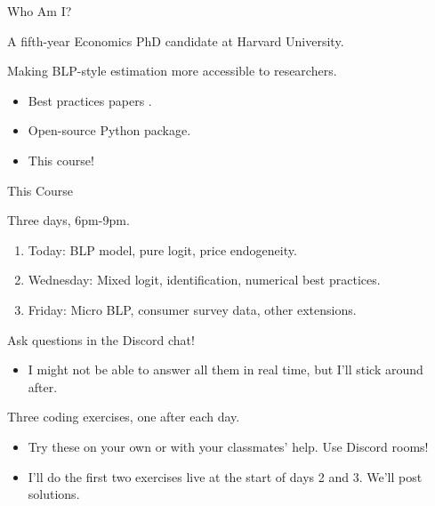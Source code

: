 \documentclass[aspectratio=169,t,11pt,table]{beamer}
\begin{document}

\begin{frame}{Who Am I?}
    \begin{wideitemize}
        \item A fifth-year Economics PhD candidate at Harvard University.
        \pause
        \item Making BLP-style estimation more accessible to researchers.
        \begin{itemize}
            \item Best practices papers \citep{conlon2020best,conlon2025incorporating}.
            \item Open-source Python package.
            \item This course!
        \end{itemize}
    \end{wideitemize}
\end{frame}

\begin{frame}{This Course}
    \begin{wideitemize}
        \item Three days, 6pm-9pm.
        \begin{enumerate}
            \item Today: BLP model, pure logit, price endogeneity.
            \item Wednesday: Mixed logit, identification, numerical best practices.
            \item Friday: Micro BLP, consumer survey data, other extensions.
        \end{enumerate}
        \pause
        \item Ask questions in the Discord chat!
        \begin{itemize}
            \item I might not be able to answer all them in real time, but I'll stick around after.
        \end{itemize}
        \pause
        \item Three coding exercises, one after each day.
        \begin{itemize}
            \item Try these on your own or with your classmates' help. Use Discord rooms!
            \item I'll do the first two exercises live at the start of days 2 and 3. We'll post solutions.
        \end{itemize}
    \end{wideitemize}
\end{frame}
\end{document}
